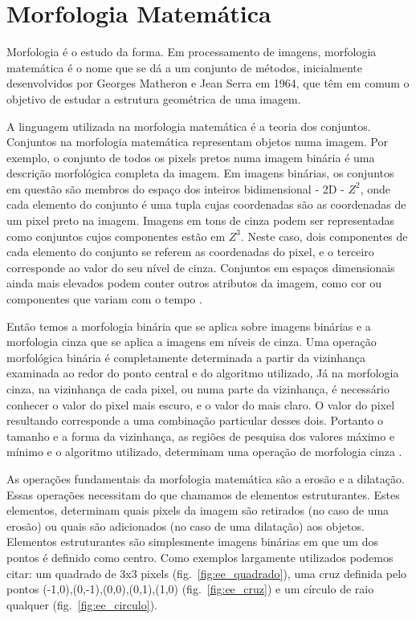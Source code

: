 \section{Morfologia Matemática}

Morfologia é o estudo da forma. Em processamento de imagens, morfologia matemática é o nome que se dá a um conjunto de métodos, inicialmente desenvolvidos por Georges Matheron e Jean Serra  em 1964, que têm em comum o objetivo de estudar a estrutura geométrica de uma imagem.

A linguagem utilizada na morfologia matemática é a teoria dos conjuntos. Conjuntos na morfologia matemática representam objetos numa imagem. Por exemplo, o conjunto de todos os pixels pretos numa imagem binária é uma descrição morfológica completa da imagem. Em imagens binárias, os conjuntos em questão são membros do espaço dos inteiros bidimensional - 2D - $Z^2$, onde cada elemento do conjunto é uma tupla cujas coordenadas são as coordenadas de um pixel preto na imagem. Imagens em tons de cinza podem ser representadas como conjuntos cujos componentes estão em $Z^3$. Neste caso, dois componentes de cada elemento do conjunto se referem as coordenadas do pixel, e o terceiro corresponde ao valor do seu nível de cinza. Conjuntos em espaços dimensionais ainda mais elevados podem conter outros atributos da imagem, como cor ou componentes que variam com o tempo \cite{gonzalez}.

Então temos a morfologia binária que se aplica sobre imagens binárias e a morfologia cinza que se aplica a imagens em níveis de cinza. Uma operação morfológica binária é completamente determinada a partir da vizinhança examinada ao redor do ponto central e do algoritmo utilizado, Já na morfologia cinza, na vizinhança de cada pixel, ou numa parte da vizinhança, é necessário conhecer o valor do pixel mais escuro, e o valor do mais claro. O valor do pixel resultando corresponde a uma combinação particular desses dois. Portanto o tamanho e a forma da vizinhança, as regiões de pesquisa dos valores máximo e mínimo e o algoritmo utilizado, determinam uma operação de morfologia cinza \cite{facon}.

As operações fundamentais da morfologia matemática são a erosão e a dilatação. Essas operações necessitam do que chamamos de elementos estruturantes. Estes elementos, determinam quais pixels da imagem são retirados (no caso de uma erosão) ou quais são adicionados (no caso de uma dilatação) aos objetos. Elementos estruturantes são simplesmente imagens binárias em que um dos pontos é definido como centro. Como exemplos largamente utilizados podemos citar: um quadrado de 3x3 pixels (fig.~\ref{fig:ee_quadrado}), uma cruz definida pelo pontos {(-1,0),(0,-1),(0,0),(0,1),(1,0)} (fig.~\ref{fig:ee_cruz}) e um círculo de raio qualquer (fig.~\ref{fig:ee_circulo}).

